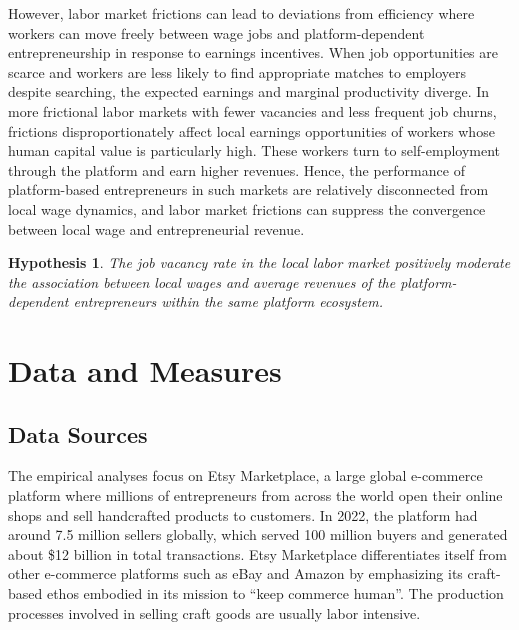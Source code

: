 \documentclass[letterpaper,12pt]{article}
\newtheorem{hypothesis}{Hypothesis}
\begin{document}
However, labor market frictions can lead to deviations from efficiency where workers can move freely between wage jobs and platform-dependent entrepreneurship in response to earnings incentives. When job opportunities are scarce and workers are less likely to find appropriate matches to employers despite searching, the expected earnings and marginal productivity diverge. In more frictional labor markets with fewer vacancies and less frequent job churns, frictions disproportionately affect local earnings opportunities of workers whose human capital value is particularly high. These workers turn to self-employment through the platform and earn higher revenues. Hence, the performance of platform-based entrepreneurs in such markets are relatively disconnected from local wage dynamics, and labor market frictions can suppress the convergence between local wage and entrepreneurial revenue.
\begin{hypothesis}
The job vacancy rate in the local labor market positively moderate the association between local wages and average revenues of the platform-dependent entrepreneurs within the same platform ecosystem.
\end{hypothesis}


\section{Data and Measures}

\subsection{Data Sources}
The empirical analyses focus on Etsy Marketplace, a large global e-commerce platform where millions of entrepreneurs from across the world open their online shops and sell handcrafted products to customers. In 2022, the platform had around 7.5 million sellers globally, which served 100 million buyers and generated about \$12 billion in total transactions. Etsy Marketplace differentiates itself from other e-commerce platforms such as eBay and Amazon by emphasizing its craft-based ethos embodied in its mission to ``keep commerce human''. The production processes involved in selling craft goods are usually labor intensive.
\end{document}
